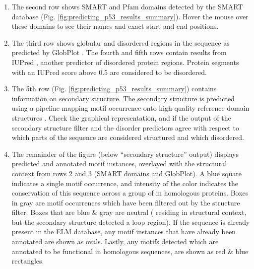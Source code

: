 \documentclass[12pt]{article}
\begin{document}
\begin{enumerate}
\item The second row shows SMART and Pfam domains detected by the SMART
	database \citep{9600884, 25300481, 9600884}
	(Fig. \ref{fig:predicting_p53_results_summary}). Hover the
	mouse over these domains to see their names and exact start and end
	positions.


\item The third row shows globular and disordered regions in the
	sequence as predicted by GlobPlot \citep{12824398}. The fourth
	and fifth rows
	contain results from IUPred \citep{15955779}, another
	predictor of disordered protein regions. Protein segments with
	an IUPred score above 0.5 are considered to be disordered.


\item The 5th row (Fig. \ref{fig:predicting_p53_results_summary}) contains
	information on secondary structure. The secondary structure is
	predicted using a pipeline mapping motif occurrence onto high quality
	reference domain structures \citep{19852836}. Check the graphical
	representation, and if the output of the secondary structure filter and
	the disorder predictors agree with respect to which parts of the
	sequence are considered structured and which disordered.

\item The remainder of the figure (below ``secondary structure'' output)
	displays predicted and annotated motif instances, overlayed with the
	structural context from rows 2 and 3 (SMART domains and GlobPlot). A
	blue square indicates a single motif occurrence, and intensity of the
	color indicates the conservation of this sequence across a group of in
	homologous proteins.
	Boxes in gray are motif occurrences which have been filtered out by the
	structure filter. Boxes that are blue \& gray are neutral (
	residing in structural context, but the secondary structure detected a
	loop region). If the sequence is already present in the ELM database,
	any motif instances that have already been annotated are shown as
	ovals. Lastly, any motifs detected which are annotated to be
	functional in homologous sequences, are shown as red \& blue
	rectangles.


\end{enumerate}
\end{document}
